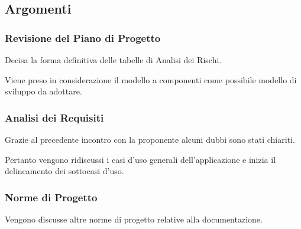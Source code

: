         \subsection{Argomenti}
            \subsubsection{Revisione del Piano di Progetto}
            Decisa la forma definitiva delle tabelle di Analisi dei Rischi.\par
            Viene preso in considerazione il modello a componenti come possibile modello di sviluppo da adottare.\par
            
            \subsubsection{Analisi dei Requisiti}
            Grazie al precedente incontro con la proponente {\II} alcuni dubbi sono stati chiariti.\par
            Pertanto vengono ridiscussi i casi d'uso generali dell'applicazione e inizia il delineamento dei sottocasi d'uso.
            
            \subsubsection{Norme di Progetto}
            Vengono discusse altre norme di progetto relative alla documentazione.

